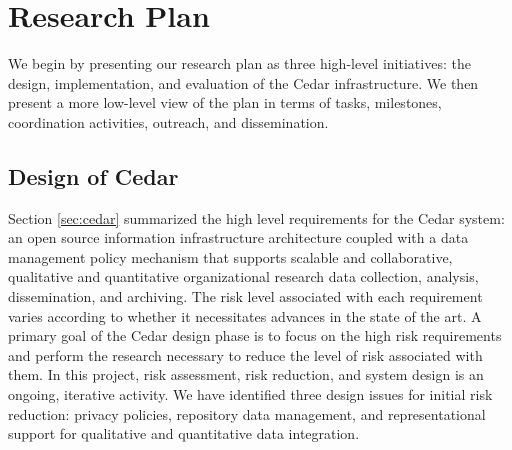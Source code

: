 
\section{Research Plan}

We begin by presenting our research plan as three high-level initiatives:
the design, implementation, and evaluation of the Cedar infrastructure.  We
then present a more low-level view of the plan in terms of tasks,
milestones, coordination activities, outreach, and dissemination.

\subsection{Design of Cedar}

Section \ref{sec:cedar} summarized the high level requirements for the
Cedar system: an open source information infrastructure architecture
coupled with a data management policy mechanism that supports scalable and
collaborative, qualitative and quantitative organizational research data
collection, analysis, dissemination, and archiving.  The risk level
associated with each requirement varies according to whether it
necessitates advances in the state of the art.  A primary goal of the Cedar
design phase is to focus on the high risk requirements and perform the
research necessary to reduce the level of risk associated with them.  In
this project, risk assessment, risk reduction, and system design is an
ongoing, iterative activity. We have identified three design issues for
initial risk reduction: privacy policies, repository data management, and
representational support for qualitative and quantitative data integration.

